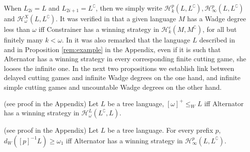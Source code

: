 When $L_{2i}=L$ and $L_{2i+1}=L^\complement$, then we simply write $\mathcal{H}^p_k(L, L^\complement), \mathcal{H}^p_\infty(L, L^\complement)$ and  $\mathcal{H}^{X}_\omega(L, L^\complement)$.
It was verified in \cite{bp} that a given language $M$ has a Wadge degree less than $\omega$ iff Constrainer has a winning strategy in $\mathcal{H}^\varepsilon_k(M, M^\complement)$, for all but finitely many $k<\omega$.
In \cite{bp} it was also remarked that the language $L$ described in \cite[Section 4.1]{bp} and in Proposition \ref{rem:example} in the Appendix, even  if it is such that Alternator has a winning strategy in every corresponding finite cutting game, she looses the infinite one.
In the next two propositions we establish link between delayed cutting games and infinite Wadge degrees on the one hand, and infinite simple cutting games and uncountable Wadge degrees on the other hand.
\begin{proposition} (see proof in the Appendix) \label{prop:omega} Let $L$ be a tree language, $[\omega]^+ \leq_W L$ iff Alternator has a winning strategy in $\mathcal{H}^{L}_\omega(L^\complement, L)$. 
\end{proposition}
\begin{proposition} (see proof in the Appendix)  \label{prop:infinity} Let $L$ be a tree language. For every prefix $p$,
$d_W([p]^{-1}L) \geq \omega_1$ iff Alternator has a winning strategy in $\mathcal{H}^p_\infty(L, L^\complement)$. 
\end{proposition}

